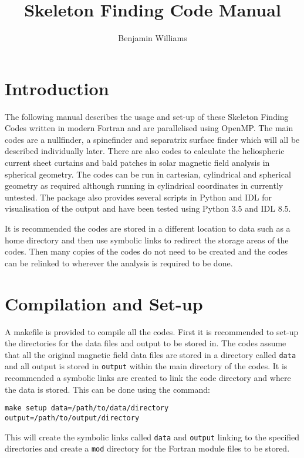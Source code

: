 \documentclass[12pt]{article}
\author{Benjamin Williams}
\title{Skeleton Finding Code Manual}
\begin{document}
  \maketitle

  \section{Introduction}

    The following manual describes the usage and set-up of these Skeleton Finding Codes written in modern Fortran and are parallelised using OpenMP. The main codes are a nullfinder, a spinefinder and separatrix surface finder which will all be described individually later. There are also codes to calculate the heliospheric current sheet curtains and bald patches in solar magnetic field analysis in spherical geometry. The codes can be run in cartesian, cylindrical and spherical geometry as required although running in cylindrical coordinates in currently untested. The package also provides several scripts in Python and IDL for visualisation of the output  and have been tested using Python 3.5 and IDL 8.5.
    
    It is recommended the codes are stored in a different location to data such as a home directory and then use symbolic links to redirect the storage areas of the codes. Then many copies of the codes do not need to be created and the codes can be relinked to wherever the analysis is required to be done. 

    \section{Compilation and Set-up}

    A makefile is provided to compile all the codes. First it is recommended to set-up the directories for the data files and output to be stored in. The codes assume that all the original magnetic field data files are stored in a directory called \texttt{data} and all output is stored in \texttt{output} within the main directory of the codes. It is recommended a symbolic links are created to link the code directory and where the data is stored. This can be done using the command:

    \texttt{make setup data=/path/to/data/directory output=/path/to/output/directory}

    This will create the symbolic links called \texttt{data} and \texttt{output} linking to the specified directories and create a \texttt{mod} directory for the Fortran module files to be stored.
\end{document}
